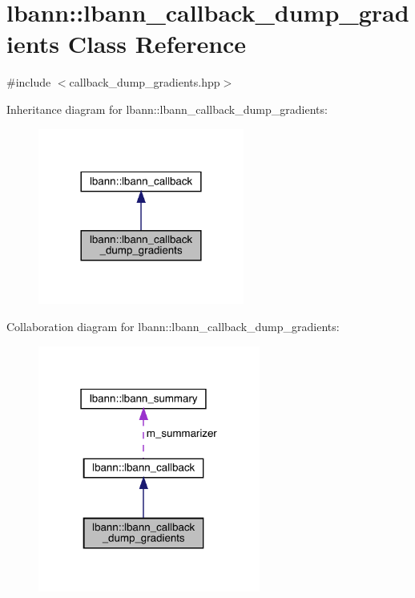 \hypertarget{classlbann_1_1lbann__callback__dump__gradients}{}\section{lbann\+:\+:lbann\+\_\+callback\+\_\+dump\+\_\+gradients Class Reference}
\label{classlbann_1_1lbann__callback__dump__gradients}


{\ttfamily \#include $<$callback\+\_\+dump\+\_\+gradients.\+hpp$>$}



Inheritance diagram for lbann\+:\+:lbann\+\_\+callback\+\_\+dump\+\_\+gradients\+:\nopagebreak
\begin{figure}[H]
\begin{center}
\leavevmode
\includegraphics[width=192pt]{classlbann_1_1lbann__callback__dump__gradients__inherit__graph}
\end{center}
\end{figure}


Collaboration diagram for lbann\+:\+:lbann\+\_\+callback\+\_\+dump\+\_\+gradients\+:\nopagebreak
\begin{figure}[H]
\begin{center}
\leavevmode
\includegraphics[width=207pt]{classlbann_1_1lbann__callback__dump__gradients__coll__graph}
\end{center}
\end{figure}

